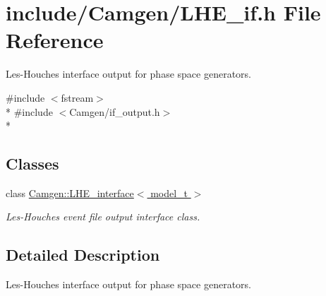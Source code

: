 \hypertarget{a00679}{}\section{include/\+Camgen/\+L\+H\+E\+\_\+if.h File Reference}
\label{a00679}


Les-\/\+Houches interface output for phase space generators.  


{\ttfamily \#include $<$fstream$>$}\\*
{\ttfamily \#include $<$Camgen/if\+\_\+output.\+h$>$}\\*
\subsection*{Classes}
\begin{DoxyCompactItemize}
\item 
class \hyperlink{a00327}{Camgen\+::\+L\+H\+E\+\_\+interface$<$ model\+\_\+t $>$}
\begin{DoxyCompactList}\small\item\em Les-\/\+Houches event file output interface class. \end{DoxyCompactList}\end{DoxyCompactItemize}


\subsection{Detailed Description}
Les-\/\+Houches interface output for phase space generators. 

